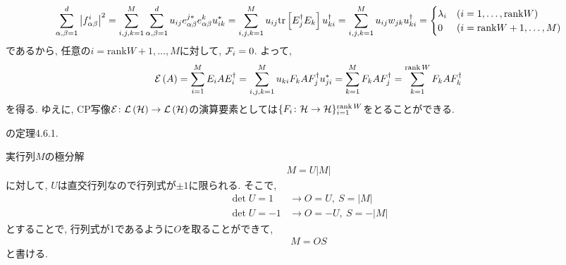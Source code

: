 \begin{ex}
    \begin{align*}
        \sum_{\alpha,\beta=1}^d
        \left| f_{\alpha \beta}^{i} \right|^2
        =
        \sum_{i,j,k=1}^M
        \sum_{\alpha, \beta = 1}^d
        u_{i j} e_{\alpha \beta}^{j*} e_{\alpha \beta}^k u_{ik}^*
        =
        \sum_{i,j,k=1}^M
        u_{ij} \mathrm{tr}\left[ E_j^\dagger E_k\right] u^\dagger_{ki}
        =
        \sum_{i,j,k=1}^M u_{ij} w_{jk} u^\dagger_{ki}
        =
        \begin{cases}
            \lambda_i & ( i = 1, \dots, \mathrm{rank} W)      \\
            0         & ( i = \mathrm{rank} W + 1, \dots , M)
        \end{cases}
    \end{align*}
    であるから, 任意の$i = \mathrm{rank} W + 1, \dots , M $に対して, $\mathcal{F}_i = 0$.
    よって,
    \begin{align*}
        \mathcal{E} \left( A \right)
        =
        \sum_{i=1}^M
        E_i A E_i^{\dagger}
        =
        \sum_{i,j,k=1}^M
        u_{ki}F_k A F_j^{\dagger} u_{ji}^*
        =
        \sum_{k=1}^M
        F_k A F_j^{\dagger}
        =
        \sum_{k=1}^{\operatorname{rank} W}
        F_k A F_k^\dagger
    \end{align*}
    を得る.
    ゆえに, CP写像$\mathcal{E} \colon \mathcal{L}\left({\mathcal{H}}\right) \to \mathcal{L}\left({\mathcal{H}}\right)$の演算要素としては$\{F_i \colon \mathcal{H} \to \mathcal{H} \}_{i=1}^{\operatorname{rank} W}$をとることができる.
\end{ex}

\begin{ex}
    \label{ex8.11}
    \cite{Ishizaka2012}の定理4.6.1.
\end{ex}

\begin{ex}
    \label{ex8.12}
    実行列$M$の極分解
    \begin{align*}
        M = U |M|
    \end{align*}
    に対して, $U$は直交行列なので行列式が$\pm1$に限られる. そこで,
    \begin{align*}
        \det U = 1  & \rightarrow O = U, \ S = |M|   \\
        \det U = -1 & \rightarrow O = -U, \ S = -|M|
    \end{align*}
    とすることで, 行列式が1であるように$O$を取ることができて,
    \begin{align*}
        M = OS
    \end{align*}
    と書ける.
\end{ex}

